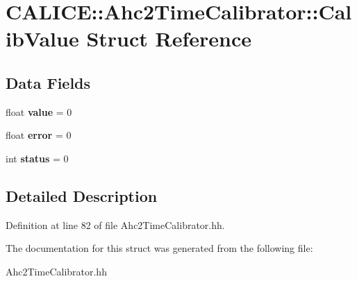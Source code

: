 \section{C\-A\-L\-I\-C\-E\-:\-:Ahc2\-Time\-Calibrator\-:\-:Calib\-Value Struct Reference}
\label{structCALICE_1_1Ahc2TimeCalibrator_1_1CalibValue}
\subsection*{Data Fields}
\begin{DoxyCompactItemize}
\item 
float {\bfseries value} = 0\label{structCALICE_1_1Ahc2TimeCalibrator_1_1CalibValue_ad2a9cafc44c17655222169b6c0041926}

\item 
float {\bfseries error} = 0\label{structCALICE_1_1Ahc2TimeCalibrator_1_1CalibValue_a162fa2aca4d5929b6968fc7b83321b92}

\item 
int {\bfseries status} = 0\label{structCALICE_1_1Ahc2TimeCalibrator_1_1CalibValue_adca6b8d83c931bac004f39d8b0d5476c}

\end{DoxyCompactItemize}


\subsection{Detailed Description}


Definition at line 82 of file Ahc2\-Time\-Calibrator.\-hh.



The documentation for this struct was generated from the following file\-:\begin{DoxyCompactItemize}
\item 
Ahc2\-Time\-Calibrator.\-hh\end{DoxyCompactItemize}
